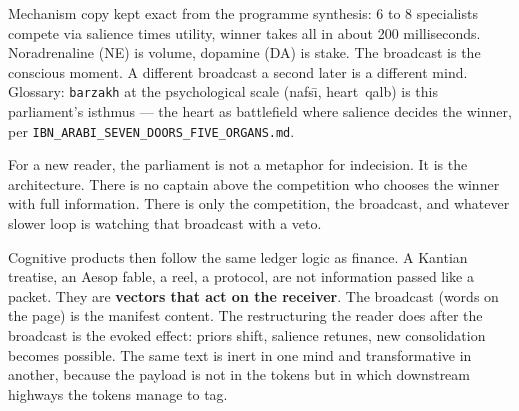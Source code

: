 Mechanism copy kept exact from the programme synthesis: 6 to 8 specialists compete via salience times utility, winner takes all in about 200 milliseconds. Noradrenaline (NE) is volume, dopamine (DA) is stake. The broadcast is the conscious moment. A different broadcast a second later is a different mind. Glossary: \texttt{barzakh} at the psychological scale (nafs\=\i, heart~qalb) is this parliament's isthmus --- the heart as battlefield where salience decides the winner, per \texttt{IBN\_ARABI\_SEVEN\_DOORS\_FIVE\_ORGANS.md}.

For a new reader, the parliament is not a metaphor for indecision. It is the architecture. There is no captain above the competition who chooses the winner with full information. There is only the competition, the broadcast, and whatever slower loop is watching that broadcast with a veto.

Cognitive products then follow the same ledger logic as finance. A Kantian treatise, an Aesop fable, a reel, a protocol, are not information passed like a packet. They are \textbf{vectors that act on the receiver}. The broadcast (words on the page) is the manifest content. The restructuring the reader does after the broadcast is the evoked effect: priors shift, salience retunes, new consolidation becomes possible. The same text is inert in one mind and transformative in another, because the payload is not in the tokens but in which downstream highways the tokens manage to tag.

